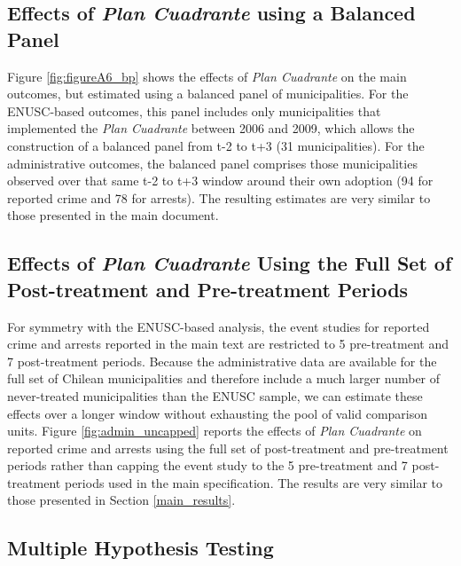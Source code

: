
\clearpage

\subsection{Effects of \emph{Plan Cuadrante} using a Balanced Panel}

Figure \ref{fig:figureA6_bp} shows the effects of \emph{Plan Cuadrante} on the main outcomes, but estimated using a balanced panel of municipalities. For the ENUSC-based outcomes, this panel includes only municipalities that implemented the \emph{Plan Cuadrante} between 2006 and 2009, which allows the construction of a balanced panel from t-2 to t+3 (31 municipalities). For the administrative outcomes, the balanced panel comprises those municipalities observed over that same t-2 to t+3 window around their own adoption (94 for reported crime and 78 for arrests). The resulting estimates are very similar to those presented in the main document.


\clearpage

\subsection{Effects of \emph{Plan Cuadrante} Using the Full Set of Post-treatment and Pre-treatment Periods}
\label{sec:admin_uncapped}

For symmetry with the ENUSC-based analysis, the event studies for reported crime and arrests reported in the main text are restricted to 5 pre-treatment and 7 post-treatment periods. Because the administrative data are available for the full set of Chilean municipalities and therefore include a much larger number of never-treated municipalities than the ENUSC sample, we can estimate these effects over a longer window without exhausting the pool of valid comparison units. Figure \ref{fig:admin_uncapped} reports the effects of \emph{Plan Cuadrante} on reported crime and arrests using the full set of post-treatment and pre-treatment periods rather than capping the event study to the 5 pre-treatment and 7 post-treatment periods used in the main specification. The results are very similar to those presented in Section \ref{main_results}.


\clearpage

\subsection{Multiple Hypothesis Testing}
\label{sec:bonferroni}

